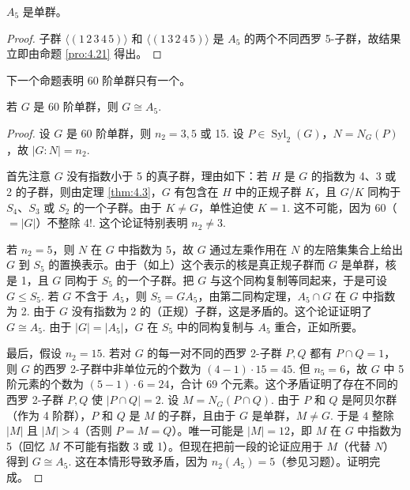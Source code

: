 \begin{corollary}\label{cor:4.22}
\(A_5\) 是单群。
\end{corollary}

\begin{proof}
子群 \(\langle (1\,2\,3\,4\,5) \rangle\) 和 \(\langle (1\,3\,2\,4\,5) \rangle\) 是 \(A_5\) 的两个不同西罗 5-子群，故结果立即由命题 \ref{pro:4.21} 得出。
\end{proof}

下一个命题表明 60 阶单群只有一个。

\begin{proposition}\label{pro:4.23}
若 \(G\) 是 60 阶单群，则 \(G \cong A_5\).
\end{proposition}

\begin{proof}
设 \(G\) 是 60 阶单群，则 \(n_2 = 3, 5\) 或 15. 设 \(P \in \operatorname{Syl}_2(G)\)，\(N = N_G(P)\)，故 \(|G : N| = n_2\).

首先注意 \(G\) 没有指数小于 5 的真子群，理由如下：若 \(H\) 是 \(G\) 的指数为 4、3 或 2 的子群，则由定理 \ref{thm:4.3}，\(G\) 有包含在 \(H\) 中的正规子群 \(K\)，且 \(G/K\) 同构于 \(S_4\)、\(S_3\) 或 \(S_2\) 的一个子群。由于 \(K \neq G\)，单性迫使 \(K = 1\). 这不可能，因为 60（\(= |G|\)）不整除 4!. 这个论证特别表明 \(n_2 \neq 3\).

若 \(n_2 = 5\)，则 \(N\) 在 \(G\) 中指数为 5，故 \(G\) 通过左乘作用在 \(N\) 的左陪集集合上给出 \(G\) 到 \(S_5\) 的置换表示。由于（如上）这个表示的核是真正规子群而 \(G\) 是单群，核是 1，且 \(G\) 同构于 \(S_5\) 的一个子群。把 \(G\) 与这个同构复制等同起来，于是可设 \(G \leq S_5\). 若 \(G\) 不含于 \(A_5\)，则 \(S_5 = GA_5\)，由第二同构定理，\(A_5 \cap G\) 在 \(G\) 中指数为 2. 由于 \(G\) 没有指数为 2 的（正规）子群，这是矛盾的。这个论证证明了 \(G \cong A_5\). 由于 \(|G| = |A_5|\)，\(G\) 在 \(S_5\) 中的同构复制与 \(A_5\) 重合，正如所要。

最后，假设 \(n_2 = 15\). 若对 \(G\) 的每一对不同的西罗 2-子群 \(P, Q\) 都有 \(P \cap Q = 1\)，则 \(G\) 的西罗 2-子群中非单位元的个数为 \((4-1) \cdot 15 = 45\). 但 \(n_5 = 6\)，故 \(G\) 中 5 阶元素的个数为 \((5-1) \cdot 6 = 24\)，合计 69 个元素。这个矛盾证明了存在不同的西罗 2-子群 \(P, Q\) 使 \(|P \cap Q| = 2\). 设 \(M = N_G(P \cap Q)\). 由于 \(P\) 和 \(Q\) 是阿贝尔群（作为 4 阶群），\(P\) 和 \(Q\) 是 \(M\) 的子群，且由于 \(G\) 是单群，\(M \neq G\). 于是 \(4\) 整除 \(|M|\) 且 \(|M| > 4\)（否则 \(P = M = Q\)）。唯一可能是 \(|M| = 12\)，即 \(M\) 在 \(G\) 中指数为 5（回忆 \(M\) 不可能有指数 3 或 1）。但现在把前一段的论证应用于 \(M\)（代替 \(N\)）得到 \(G \cong A_5\). 这在本情形导致矛盾，因为 \(n_2(A_5) = 5\)（参见习题）。证明完成。
\end{proof}

